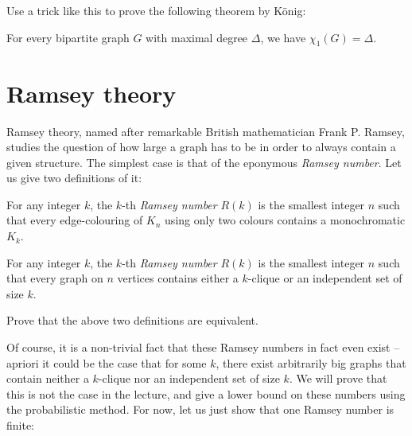 \documentclass[nobib]{tufte-handout}
\begin{document}
\begin{xca}
    Use a trick like this to prove the following theorem by König:

    \begin{theorem}[König, 1916]
        For every bipartite graph $G$ with maximal degree $\Delta$, we have $\chi_1(G) = \Delta$.
    \end{theorem}
\end{xca}

\section{Ramsey theory}

Ramsey theory, named after remarkable British mathematician Frank P. Ramsey, studies the question of how large a graph has to be in order to always contain a given structure. The simplest case is that of the eponymous \emph{Ramsey number}. Let us give two definitions of it:

\begin{definition}
    For any integer $k$, the $k$-th \emph{Ramsey number} $R(k)$ is the smallest integer $n$ such that every edge-colouring of $K_n$ using only two colours contains a monochromatic $K_k$.
\end{definition}

\begin{definition}
    For any integer $k$, the $k$-th \emph{Ramsey number} $R(k)$ is the smallest integer $n$ such that every graph on $n$ vertices contains either a $k$-clique or an independent set of size $k$.
\end{definition}

\begin{xca}
    Prove that the above two definitions are equivalent.
\end{xca}

Of course, it is a non-trivial fact that these Ramsey numbers in fact even exist -- apriori it could be the case that for some $k$, there exist arbitrarily big graphs that contain neither a $k$-clique nor an independent set of size $k$. We will prove that this is not the case in the lecture, and give a lower bound on these numbers using the probabilistic method. For now, let us just show that one Ramsey number is finite:
\end{document}
